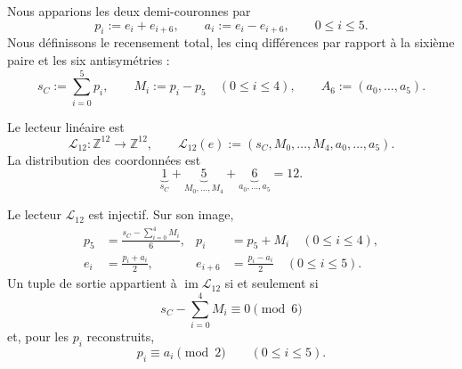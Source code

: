{Nous apparions les deux demi-couronnes par
\begin{equation}
 p_i:=e_i+e_{i+6},
 \qquad
 a_i:=e_i-e_{i+6},
 \qquad 0\leq i\leq5.
 \label{p12-83-c1-s9:eq:u006d-pares-antipodales}
\end{equation}
Nous définissons le recensement total, les cinq différences par rapport à la sixième paire et
les six antisymétries :
\begin{equation}
 s_C:=\sum_{i=0}^{5}p_i,
 \qquad
 M_i:=p_i-p_5\quad(0\leq i\leq4),
 \qquad
 A_6:=(a_0,\ldots,a_5).
 \label{p12-83-c1-s9:eq:u006d-coordenadas-uno-cinco-seis}
\end{equation}

\begin{definition}
\label{p12-83-c1-s9:def:u006d-lector-integral}
Le lecteur linéaire est
\begin{equation}
 \mathcal L_{12}:\mathbb Z^{12}\longrightarrow\mathbb Z^{12},
 \qquad
 \mathcal L_{12}(e)
 :=
 (s_C,M_0,\ldots,M_4,a_0,\ldots,a_5).
 \label{p12-83-c1-s9:eq:u006d-lector-l12}
\end{equation}
La distribution des coordonnées est
\begin{equation}
 \underbrace{1}_{s_C}
 +\underbrace{5}_{M_0,\ldots,M_4}
 +\underbrace{6}_{a_0,\ldots,a_5}
 =12.
 \label{p12-83-c1-s9:eq:u006d-uno-cinco-seis}
\end{equation}
\end{definition}

\begin{theorem}
\label{p12-83-c1-s9:thm:u006d-inversa-l12}
Le lecteur \(\mathcal L_{12}\) est injectif. Sur son image,
\begin{align}
 p_5&=
 \frac{s_C-\sum_{i=0}^{4}M_i}{6},
 &
 p_i&=p_5+M_i\quad(0\leq i\leq4),
 \label{p12-83-c1-s9:eq:u006d-inversa-p}\\
 e_i&=\frac{p_i+a_i}{2},
 &
 e_{i+6}&=\frac{p_i-a_i}{2}
 \quad(0\leq i\leq5).
 \label{p12-83-c1-s9:eq:u006d-inversa-e}
\end{align}
Un tuple de sortie appartient à \(\operatorname{im}\mathcal L_{12}\) si et
seulement si
\begin{equation}
 s_C-\sum_{i=0}^{4}M_i\equiv0\pmod6
 \label{p12-83-c1-s9:eq:u006d-condicion-divisibilidad}
\end{equation}
et, pour les \(p_i\) reconstruits,
\begin{equation}
 p_i\equiv a_i\pmod2
 \qquad(0\leq i\leq5).
 \label{p12-83-c1-s9:eq:u006d-condicion-paridad}
\end{equation}
\end{theorem}

}
